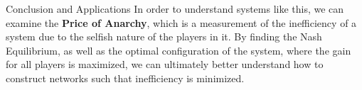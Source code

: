\documentclass[final]{beamer}
\newlength{\onecolwid}
\begin{document}
\begin{frame}[t]
\begin{columns}[t]
\begin{column}{\onecolwid}
\begin{block}{Conclusion and Applications}
In order to understand systems like this, we can examine the \textbf{Price of Anarchy}, which is a measurement of the inefficiency of a system due to the selfish nature of the players in it. By finding the Nash Equilibrium, as well as the optimal configuration of the system, where the gain for all players is maximized, we can ultimately better understand how to construct networks such that inefficiency is minimized.




\end{block}










\end{column} %

\end{columns} %

\end{frame} %
\end{document}
